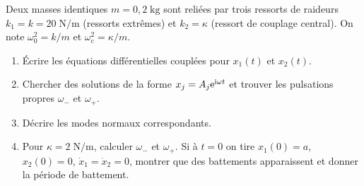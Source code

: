 \documentclass[12pt,a4paper]{article}
\begin{document}
\begin{boiteexercice}
Deux masses identiques $m=0{,}2\;\text{kg}$ sont reliées par trois ressorts de raideurs $k_1=k=20\;\text{N/m}$ (ressorts extrêmes) et $k_2=\kappa$ (ressort de couplage central). On note $\omega_0^2=k/m$ et $\omega_c^2=\kappa/m$.
\begin{enumerate}
  \item Écrire les équations différentielles couplées pour $x_1(t)$ et $x_2(t)$.
  \item Chercher des solutions de la forme $x_j=A_j\mathrm{e}^{\mathrm{i}\omega t}$ et trouver les pulsations propres $\omega_-$ et $\omega_+$.
  \item Décrire les modes normaux correspondants.
  \item Pour $\kappa=2\;\text{N/m}$, calculer $\omega_-$ et $\omega_+$. Si à $t=0$ on tire $x_1(0)=a$, $x_2(0)=0$, $\dot x_1=\dot x_2=0$, montrer que des battements apparaissent et donner la période de battement.
\end{enumerate}
\end{boiteexercice}
\end{document}
